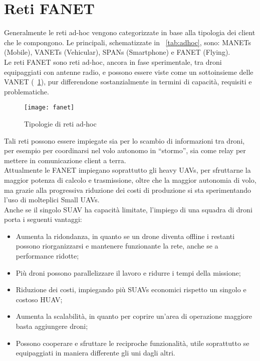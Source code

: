 \section[Reti FANET]{Reti FANET}
Generalmente le reti ad-hoc vengono categorizzate in base alla tipologia dei client che le compongono. Le principali, schematizzate in \tablename\ \ref{tab:adhoc}, sono: MANETs (Mobile), VANETs (Vehicular), SPANs (Smartphone) e FANET (Flying). \\
Le reti FANET sono reti ad-hoc, ancora in fase sperimentale, tra droni equipaggiati con antenne radio, e possono essere viste come un sottoinsieme delle VANET (\figurename\ \ref{fig:fanet}), pur differendone sostanzialmente in termini di capacità, requisiti e problematiche. 
%
\begin{figure}
	\begin{center}
		\texttt{[image: fanet]}
	\end{center}
	\caption{Tipologie di reti ad-hoc} \label{fig:fanet}
\end{figure}
%
Tali reti possono essere impiegate sia per lo scambio di informazioni tra droni, per esempio per coordinarsi nel volo autonomo in “stormo”, sia come relay per mettere in comunicazione client a terra. \\
Attualmente le FANET impiegano soprattutto gli heavy UAVs, per sfruttarne la maggior potenza di calcolo e trasmissione, oltre che la maggior autonomia di volo, ma grazie alla progressiva riduzione dei costi di produzione si sta sperimentando l'uso di molteplici Small UAVs. \\
Anche se il singolo SUAV ha capacità limitate, l'impiego di una squadra di droni  porta i seguenti vantaggi:
\begin{itemize}
	\item Aumenta la ridondanza, in quanto se un drone diventa offline i restanti possono riorganizzarsi e mantenere funzionante la rete, anche se a performance ridotte;
	\item Più droni possono parallelizzare il lavoro e ridurre i tempi della missione;
	\item Riduzione dei costi, impiegando più SUAVs economici rispetto un singolo e costoso HUAV;
	\item Aumenta la scalabilità, in quanto per coprire un'area di operazione maggiore basta aggiungere droni;
	\item Possono cooperare e sfruttare le reciproche funzionalità, utile soprattutto se equipaggiati in maniera differente gli uni dagli altri.
\end{itemize}
